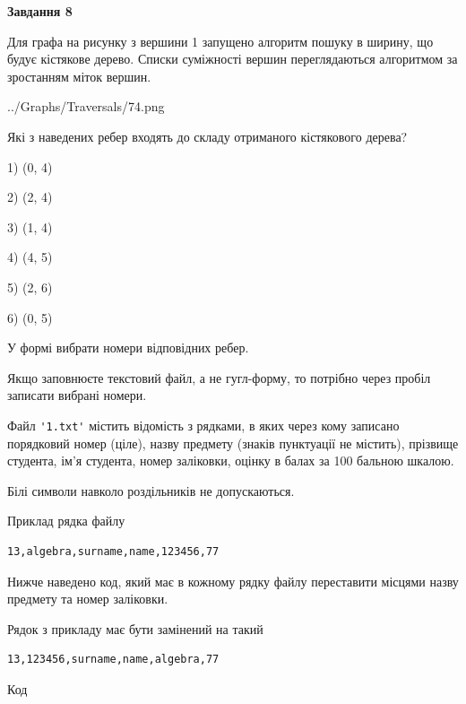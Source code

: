 \documentclass[12pt, ukrainian]{article}
\def\code#1{\Verb!#1!}
\begin{document}
{\begin {large}
{\begin {center}\textbf{Завдання 8}\end {center}}\par
Для графа на рисунку з вершини 1 запущено алгоритм пошуку в ширину, що будує кістякове дерево. Списки суміжності вершин переглядаються алгоритмом за зростанням міток вершин.\par
\begin{center}
	{../Graphs/Traversals/74.png}
\end{center}
\par Які з наведених ребер входять до складу отриманого кістякового дерева?\par
1) (0, 4)\par
2) (2, 4)\par
3) (1, 4)\par
4) (4, 5)\par
5) (2, 6)\par
6) (0, 5)\par
{\vskip 15pt} У формі вибрати номери відповідних ребер.


Якщо заповнюєте текстовий файл, а не гугл-форму, то потрібно через пробіл записа\-ти вибрані номери.\par
\newpage


Файл \code{'1.txt'} містить відомість з рядками, в яких через кому записано поряд\-ковий номер (ціле), назву предмету (знаків пунктуації не містить), прізвище студента, ім'я студента, номер заліковки, оцінку в балах за 100 бальною шкалою.

Білі символи навколо роздільників не допускаються.

Приклад рядка файлу



\begin{verbatim}
13,algebra,surname,name,123456,77
\end{verbatim}


Нижче наведено код, який має в кожному рядку файлу переставити місцями назву предмету та номер заліковки.

Рядок з прикладу має бути замінений на такий



\begin{verbatim}
13,123456,surname,name,algebra,77
\end{verbatim}




Код




\end{large}}
\end{document}
